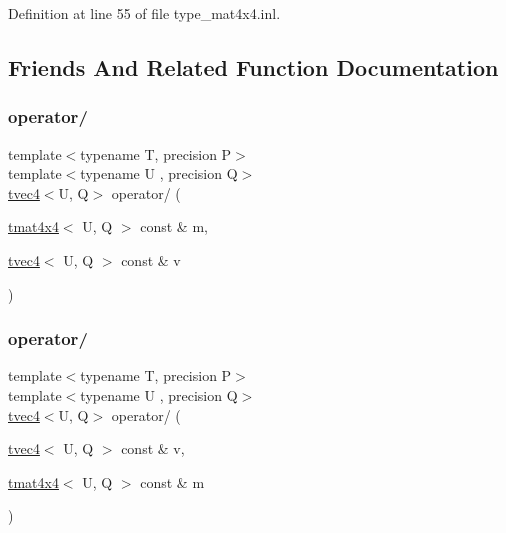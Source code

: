 Definition at line 55 of file type\+\_\+mat4x4.\+inl.



\subsection{Friends And Related Function Documentation}
\mbox{\label{structglm_1_1detail_1_1tmat4x4_a4d1472f6e50839c280a3a7f32396b3f1}} 
\subsubsection{\texorpdfstring{operator/}{operator/}\hspace{0.1cm}{\footnotesize\ttfamily [1/2]}}
{\footnotesize\ttfamily template$<$typename T, precision P$>$ \\
template$<$typename U , precision Q$>$ \\
\hyperlink{structglm_1_1detail_1_1tvec4}{tvec4}$<$U, Q$>$ operator/ (\begin{DoxyParamCaption}\item[{\hyperlink{structglm_1_1detail_1_1tmat4x4}{tmat4x4}$<$ U, Q $>$ const \&}]{m,  }\item[{\hyperlink{structglm_1_1detail_1_1tvec4}{tvec4}$<$ U, Q $>$ const \&}]{v }\end{DoxyParamCaption})\hspace{0.3cm}{\ttfamily [friend]}}

\mbox{\label{structglm_1_1detail_1_1tmat4x4_a786a67d54520cab5d9ecd91530012ac2}} 
\subsubsection{\texorpdfstring{operator/}{operator/}\hspace{0.1cm}{\footnotesize\ttfamily [2/2]}}
{\footnotesize\ttfamily template$<$typename T, precision P$>$ \\
template$<$typename U , precision Q$>$ \\
\hyperlink{structglm_1_1detail_1_1tvec4}{tvec4}$<$U, Q$>$ operator/ (\begin{DoxyParamCaption}\item[{\hyperlink{structglm_1_1detail_1_1tvec4}{tvec4}$<$ U, Q $>$ const \&}]{v,  }\item[{\hyperlink{structglm_1_1detail_1_1tmat4x4}{tmat4x4}$<$ U, Q $>$ const \&}]{m }\end{DoxyParamCaption})\hspace{0.3cm}{\ttfamily [friend]}}



